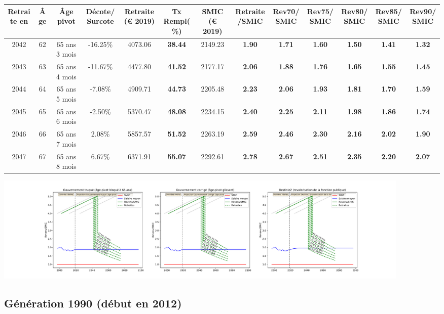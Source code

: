 { \scriptsize \begin{center} 
\begin{tabular}[htb]{|c|c||c|c||c|c||c||c|c|c|c|c|c|} 
\hline 
 Retraite en &  Âge &  Âge pivot &  Décote/Surcote &  Retraite (\euro{} 2019) &  Tx Rempl(\%) &  SMIC (\euro{} 2019) &  Retraite/SMIC &  Rev70/SMIC &  Rev75/SMIC &  Rev80/SMIC &  Rev85/SMIC &  Rev90/SMIC \\ 
\hline \hline 
 2042 &  62 &  65 ans 3 mois &  -16.25\% &  4073.06 &  {\bf 38.44} &  2149.23 &  {\bf 1.90} &  {\bf 1.71} &  {\bf 1.60} &  {\bf 1.50} &  {\bf 1.41} &  {\bf 1.32} \\ 
\hline 
 2043 &  63 &  65 ans 4 mois &  -11.67\% &  4477.80 &  {\bf 41.52} &  2177.17 &  {\bf 2.06} &  {\bf 1.88} &  {\bf 1.76} &  {\bf 1.65} &  {\bf 1.55} &  {\bf 1.45} \\ 
\hline 
 2044 &  64 &  65 ans 5 mois &  -7.08\% &  4909.71 &  {\bf 44.73} &  2205.48 &  {\bf 2.23} &  {\bf 2.06} &  {\bf 1.93} &  {\bf 1.81} &  {\bf 1.70} &  {\bf 1.59} \\ 
\hline 
 2045 &  65 &  65 ans 6 mois &  -2.50\% &  5370.47 &  {\bf 48.08} &  2234.15 &  {\bf 2.40} &  {\bf 2.25} &  {\bf 2.11} &  {\bf 1.98} &  {\bf 1.86} &  {\bf 1.74} \\ 
\hline 
 2046 &  66 &  65 ans 7 mois &  2.08\% &  5857.57 &  {\bf 51.52} &  2263.19 &  {\bf 2.59} &  {\bf 2.46} &  {\bf 2.30} &  {\bf 2.16} &  {\bf 2.02} &  {\bf 1.90} \\ 
\hline 
 2047 &  67 &  65 ans 8 mois &  6.67\% &  6371.91 &  {\bf 55.07} &  2292.61 &  {\bf 2.78} &  {\bf 2.67} &  {\bf 2.51} &  {\bf 2.35} &  {\bf 2.20} &  {\bf 2.07} \\ 
\hline 
\hline 
\end{tabular} 
\end{center} } 

 \begin{center}\includegraphics[width=0.9\textwidth]{fig/Ascendant45_1980_22_dest_retraite.pdf}\end{center} \label{fig/Ascendant45_1980_22_dest_retraite.pdf} 

\newpage 
 
\subsection{Génération 1990 (début en 2012)} 

